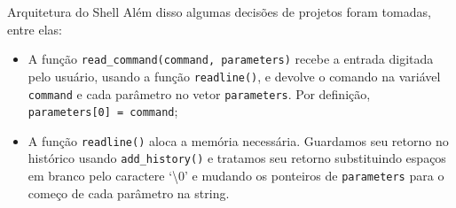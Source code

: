 \documentclass[10pt]{beamer}
\begin{document}
    \begin{frame}{Arquitetura do Shell}
      Além disso algumas decisões de projetos foram tomadas, entre elas:
      \begin{itemize}
        \justifying
        \item A função \texttt{read\_command(command, parameters)} recebe a entrada digitada pelo usuário, usando a função \texttt{readline()}, e devolve o comando na variável \texttt{command} e cada parâmetro no vetor \texttt{parameters}. Por definição, \texttt{parameters[0] = command};
        \item A função \texttt{readline()} aloca a memória necessária. Guardamos seu retorno no histórico usando \texttt{add\_history()} e tratamos seu retorno substituindo espaços em branco pelo caractere `\textbackslash 0' e mudando os ponteiros de \texttt{parameters} para o começo de cada parâmetro na string.
      \end{itemize}
    \end{frame}
\end{document}
